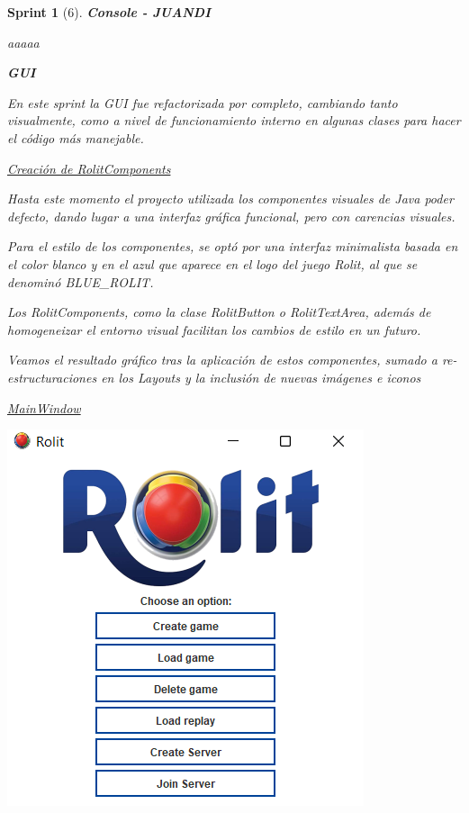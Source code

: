 \documentclass{article}
\theoremstyle{break}
\newtheorem*{sprint}{Sprint}
\begin{document}
\begin{sprint}[6]
\textbf{Console - JUANDI}

aaaaa

\textbf{GUI}

En este sprint la GUI fue refactorizada por completo, cambiando tanto visualmente, como a nivel de funcionamiento interno en algunas clases para hacer el código más manejable.

\underline{Creación de RolitComponents}

Hasta este momento el proyecto utilizada los componentes visuales de Java poder defecto, dando lugar a una interfaz gráfica funcional, pero con carencias visuales.

Para el estilo de los componentes, se optó por una interfaz minimalista basada en el color blanco y en el azul que aparece en el logo del juego Rolit, al que se denominó \textit{BLUE\_ROLIT}.

Los \textit{RolitComponents}, como la clase \textit{RolitButton} o \textit{RolitTextArea}, además de homogeneizar el entorno visual facilitan los cambios de estilo en un futuro.

Veamos el resultado gráfico tras la aplicación de estos componentes, sumado a re-estructuraciones en los Layouts y la inclusión de nuevas imágenes e iconos

\underline{MainWindow}
\begin{center}
\includegraphics[scale=1]{menu-sprint-6.png}

\end{center}


\end{sprint}
\end{document}
